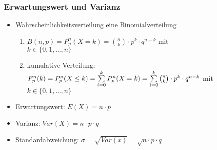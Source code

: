 \documentclass[a4paper,twocolumn,10pt]{onepgnote1}
\begin{document}
\subsubsection{Erwartungswert und Varianz}
\begin{itemize}
    \item Wahrscheinlichkeitsverteilung eine Binomialverteilung
    \begin{enumerate}
        \item $B(n,p) = P_p^n(X=k) = \binom{n}{k} \cdot p^k \cdot q^{n-k}$ mit\\ $k\in \{0, 1, \ldots, n\}$\\
        \item kumulative Verteilung:\\ $F_p^n(k) = P_p^n(X\leq k)=\sum\limits_{i=0}^k P_p^n(X=k)\\ =\sum\limits_{i=0}^k \binom{n}{k} \cdot p^k \cdot q^{n-k}$ mit $k\in \{0, 1, \ldots, n\}$
    \end{enumerate}
    \item Erwartungswert: $E(X) = n\cdot p$
    \item Varianz: $Var(X)= n\cdot p \cdot q$
    \item Standardabweichung: $\sigma = \sqrt{Var(x)} = \sqrt{n\cdot p \cdot q}$
\end{itemize}
\end{document}
